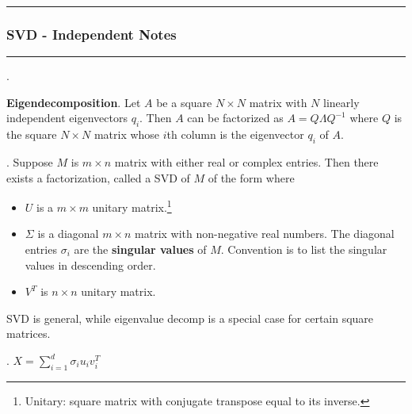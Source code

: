 \documentclass[12pt]{article}
\newcommand{\myspace}{\vspace{2\bigskipamount}}
\newcommand\p{\Needspace{10\baselineskip} \noindent}
\begin{document}
\myspace
{}
\hrule 
\subsubsection{SVD - Independent Notes}
\hrule 


\myspace
\p {}. 
\begin{compactitem}
	\item \textbf{Eigendecomposition}. Let $A$ be a square $N\times N$ matrix with $N$ linearly independent eigenvectors $q_i$. Then $A$ can be factorized as $A = Q\Lambda Q^{-1}$ where $Q$ is the square $N\times N$ matrix whose $i$th column is the eigenvector $q_i$ of $A$. 
\end{compactitem}

\myspace
\p {}. Suppose $M$ is $m\times n$ matrix with either real or complex entries. Then there exists a factorization, called a SVD of $M$ of the form
where 
\begin{itemize}
	\item $U$ is a $m \times m$ unitary matrix.\footnote{Unitary: square matrix with conjugate transpose equal to its inverse.}
	\item $\Sigma$ is a diagonal $m \times n$ matrix with non-negative real numbers. The diagonal entries $\sigma_i$ are the \textbf{singular values} of $M$. Convention is to list the singular values in descending order. 
	\item $V^T$ is $n \times n$ unitary matrix. 
\end{itemize}



\myspace
\p {} SVD is general, while eigenvalue decomp is a special case for certain square matrices. 

\myspace
\p {}. $X = \sum_{i = 1}^{d} \sigma_i u_i v_i^T$
\end{document}

